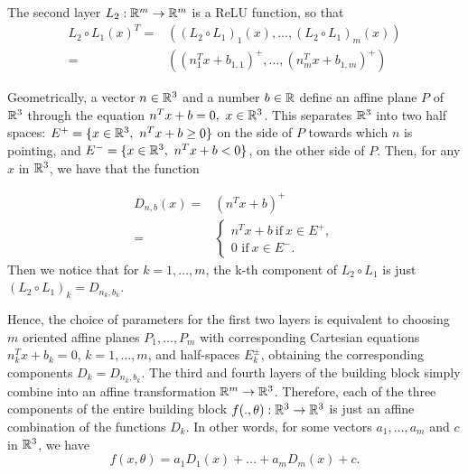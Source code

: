 The second layer $L_2:\mathbb{R}^m\rightarrow\mathbb{R}^m$ is a ReLU function, so that
\begin{equation}\begin{split}
    L_2\circ L_1(x)^T=&((L_2\circ L_{1})_1(x),\dots,(L_{2}\circ L_1)_m(x))
    \\=&((n_1^Tx+b_{1,1})^+,\dots,(n_m^Tx+b_{1,m})^+)
    \end{split}
\end{equation}

Geometrically, a vector $n\in \mathbb{R}^3$ and a number $b\in \mathbb{R}$ define an affine plane $P$ of $\mathbb{R}^3$ through the equation $n^Tx+b=0,\ x\in\mathbb{R}^3$. This separates $\mathbb{R}^3$ into two half spaces: $E^+=\{x\in\mathbb{R}^3, \ n^Tx+b\geq 0\}$ on the side of $P$ towards which $n$ is pointing, and $E^-=\{x\in\real^3, \ n^Tx+b<0\}$, on the other side of $P$. Then, for any $x$ in $\mathbb{R}^3$, we have that the function

\begin{equation}\begin{split}
    D_{n,b}(x)=&(n^Tx+b)^+\\
    =&\left\lbrace\begin{split}n^Tx+b\ \text{if}\ x\in E^+,\\
    0 \text{ if}\ x\in E^-.\end{split}\right.
    \end{split}
\end{equation}
Then we notice that for $k=1,\dots, m$, the k-th component of $L_2\circ L_1$ is just $(L_2\circ L_1)_k=D_{n_k,b_k}$. 

Hence, the choice of parameters for the first two layers is equivalent to choosing $m$ oriented affine planes $P_1,\dots,P_m$ with corresponding Cartesian equations $n_k^Tx+b_k=0$, $k=1,\dots,m$, and half-spaces $E_k^{\pm}$, obtaining the corresponding components $D_k=D_{n_k,b_k}$. %
The third and fourth layers of the building block simply combine into an affine transformation $\mathbb{R}^m\rightarrow \mathbb{R}^3$. Therefore, each of the three components of the entire building block $f(.,\theta):\mathbb{R}^3\rightarrow\mathbb{R}^3$ is just an affine combination of the functions $D_k$. In other words, for some vectors $a_1,\dots,a_m$ and $c$ in $\mathbb{R}^3$, we have
\begin{equation}\label{eq:GeometricVelocityFields}
    f(x,\theta)=a_1D_1(x)+\dots+a_mD_m(x)+c.
\end{equation}

